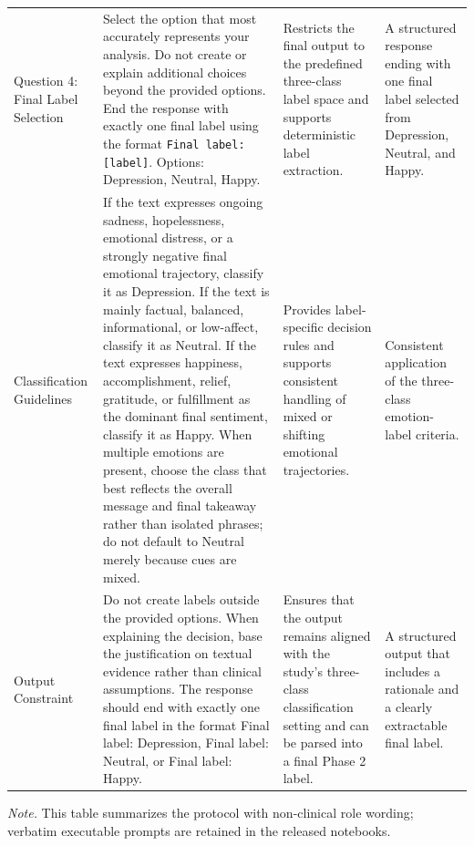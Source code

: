 \documentclass{ieeeaccess}
\begin{document}
\begin{tabularx}{\textwidth}{@{}>{\raggedright\arraybackslash}p{}YYY@{}}
Question 4: Final Label Selection & Select the option that most accurately represents your analysis. Do not create or explain additional choices beyond the provided options. End the response with exactly one final label using the format \texttt{Final label: [label]}. Options: Depression, Neutral, Happy. & Restricts the final output to the predefined three-class label space and supports deterministic label extraction. & A structured response ending with one final label selected from Depression, Neutral, and Happy. \\
Classification Guidelines & If the text expresses ongoing sadness, hopelessness, emotional distress, or a strongly negative final emotional trajectory, classify it as Depression. If the text is mainly factual, balanced, informational, or low-affect, classify it as Neutral. If the text expresses happiness, accomplishment, relief, gratitude, or fulfillment as the dominant final sentiment, classify it as Happy. When multiple emotions are present, choose the class that best reflects the overall message and final takeaway rather than isolated phrases; do not default to Neutral merely because cues are mixed. & Provides label-specific decision rules and supports consistent handling of mixed or shifting emotional trajectories. & Consistent application of the three-class emotion-label criteria. \\
Output Constraint & Do not create labels outside the provided options. When explaining the decision, base the justification on textual evidence rather than clinical assumptions. The response should end with exactly one final label in the format Final label: Depression, Final label: Neutral, or Final label: Happy. & Ensures that the output remains aligned with the study's three-class classification setting and can be parsed into a final Phase 2 label. & A structured output that includes a rationale and a clearly extractable final label. \\
\bottomrule
\end{tabularx}
\par\medskip


\noindent\footnotesize\textit{Note.} This table summarizes the protocol with non-clinical role wording; verbatim executable prompts are retained in the released notebooks.\normalsize
\end{document}
